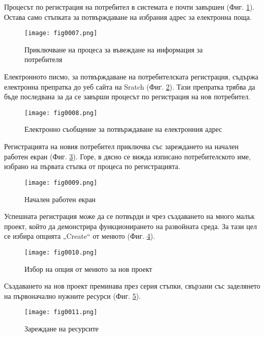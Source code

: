 Процесът по регистрация на потребител в системата е почти завършен (Фиг. \ref{fig0007}). Остава само стъпката за потвърждаване на избрания адрес за електронна поща.

\begin{figure}[H]
  \centering
  \texttt{[image: fig0007.png]}
  \caption{Приключване на процеса за въвеждане на информация за потребителя}
\label{fig0007}
\end{figure}

Електронното писмо, за потвърждаване на потребителската регистрация, съдържа електронна препратка до уеб сайта на Sratch (Фиг. \ref{fig0008}). Тази препратка трябва да бъде последвана за да се завърши процесът по регистрация на нов потребител. 

\begin{figure}[H]
  \centering
  \texttt{[image: fig0008.png]}
  \caption{Електронно съобщение за потвърждаване на електронния адрес}
\label{fig0008}
\end{figure}

Регистрацията на новия потребител приключва със зареждането на начален работен екран (Фиг. \ref{fig0009}). Горе, в дясно се вижда изписано потребителското име, избрано на първата стъпка от процеса по регистрацията.

\begin{figure}[H]
  \centering
  \texttt{[image: fig0009.png]}
  \caption{Начален работен екран}
\label{fig0009}
\end{figure}

Успешната регистрация може да се потвърди и чрез създаването на много малък проект, който да демонстрира функционирането на развойната среда. За тази цел се избира опцията „Create“ от менюто (Фиг. \ref{fig0010}).

\begin{figure}[H]
  \centering
  \texttt{[image: fig0010.png]}
  \caption{Избор на опция от менюто за нов проект}
\label{fig0010}
\end{figure}

Създаването на нов проект преминава през серия стъпки, свързани със заделянето на първоначално нужните ресурси (Фиг. \ref{fig0011}).

\begin{figure}[H]
  \centering
  \texttt{[image: fig0011.png]}
  \caption{Зареждане на ресурсите}
\label{fig0011}
\end{figure}

